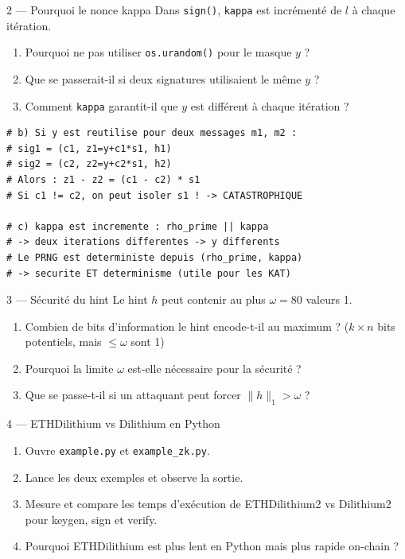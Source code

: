 \documentclass[12pt, a4paper]{article}
\begin{document}
\begin{exercice}{2 --- Pourquoi le nonce kappa}
Dans \texttt{sign()}, \texttt{kappa} est incrémenté de $l$ à chaque itération.
\begin{enumerate}[label=\alph*)]
  \item Pourquoi ne pas utiliser \texttt{os.urandom()} pour le masque $y$ ?
  \item Que se passerait-il si deux signatures utilisaient le même $y$ ?
  \item Comment \texttt{kappa} garantit-il que $y$ est différent à chaque itération ?
\end{enumerate}
\end{exercice}

\begin{solution}
\begin{lstlisting}[style=python]
# b) Si y est reutilise pour deux messages m1, m2 :
# sig1 = (c1, z1=y+c1*s1, h1)
# sig2 = (c2, z2=y+c2*s1, h2)
# Alors : z1 - z2 = (c1 - c2) * s1
# Si c1 != c2, on peut isoler s1 ! -> CATASTROPHIQUE

# c) kappa est incremente : rho_prime || kappa
# -> deux iterations differentes -> y differents
# Le PRNG est deterministe depuis (rho_prime, kappa)
# -> securite ET determinisme (utile pour les KAT)
\end{lstlisting}
\end{solution}

\begin{exercice}{3 --- Sécurité du hint}
Le hint $h$ peut contenir au plus $\omega = 80$ valeurs 1.
\begin{enumerate}[label=\alph*)]
  \item Combien de bits d'information le hint encode-t-il au maximum ?
        ($k \times n$ bits potentiels, mais $\leq \omega$ sont 1)
  \item Pourquoi la limite $\omega$ est-elle nécessaire pour la sécurité ?
  \item Que se passe-t-il si un attaquant peut forcer $\|h\|_1 > \omega$ ?
\end{enumerate}
\end{exercice}

\begin{exercice}{4 --- ETHDilithium vs Dilithium en Python}
\begin{enumerate}[label=\alph*)]
  \item Ouvre \texttt{example.py} et \texttt{example\_zk.py}.
  \item Lance les deux exemples et observe la sortie.
  \item Mesure et compare les temps d'exécution de ETHDilithium2 vs Dilithium2
        pour keygen, sign et verify.
  \item Pourquoi ETHDilithium est plus lent en Python mais plus rapide on-chain ?
\end{enumerate}
\end{exercice}
\end{document}
